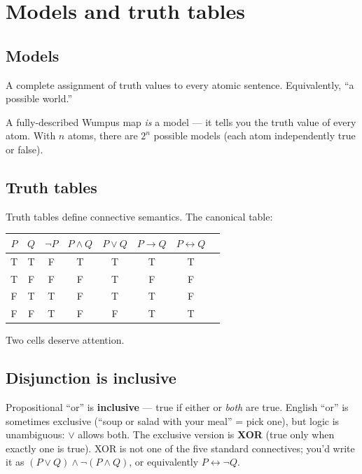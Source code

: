 \documentclass[11pt, a4paper]{article}
\begin{document}
\section{Models and truth tables}

\subsection{Models}

\begin{defbox}[Model]
A complete assignment of truth values to every atomic sentence. Equivalently, ``a possible world.''
\end{defbox}

A fully-described Wumpus map \emph{is} a model — it tells you the truth value of every atom. With $n$ atoms, there are $2^n$ possible models (each atom independently true or false).

\subsection{Truth tables}

Truth tables define connective semantics. The canonical table:

\begin{center}
\renewcommand{\arraystretch}{1.2}
\begin{tabular}{@{}cccccccc@{}}
\toprule
$P$ & $Q$ & $\neg P$ & $P \land Q$ & $P \lor Q$ & $P \rightarrow Q$ & $P \leftrightarrow Q$ \\
\midrule
T & T & F & T & T & T & T \\
T & F & F & F & T & F & F \\
F & T & T & F & T & T & F \\
F & F & T & F & F & T & T \\
\bottomrule
\end{tabular}
\end{center}

Two cells deserve attention.

\subsection{Disjunction is inclusive}

\begin{trapbox}
Propositional ``or'' is \textbf{inclusive} — true if either or \emph{both} are true. English ``or'' is sometimes exclusive (``soup or salad with your meal'' = pick one), but logic is unambiguous: $\lor$ allows both. The exclusive version is \textbf{XOR} (true only when exactly one is true). XOR is not one of the five standard connectives; you'd write it as $(P \lor Q) \land \neg (P \land Q)$, or equivalently $P \leftrightarrow \neg Q$.
\end{trapbox}
\end{document}
